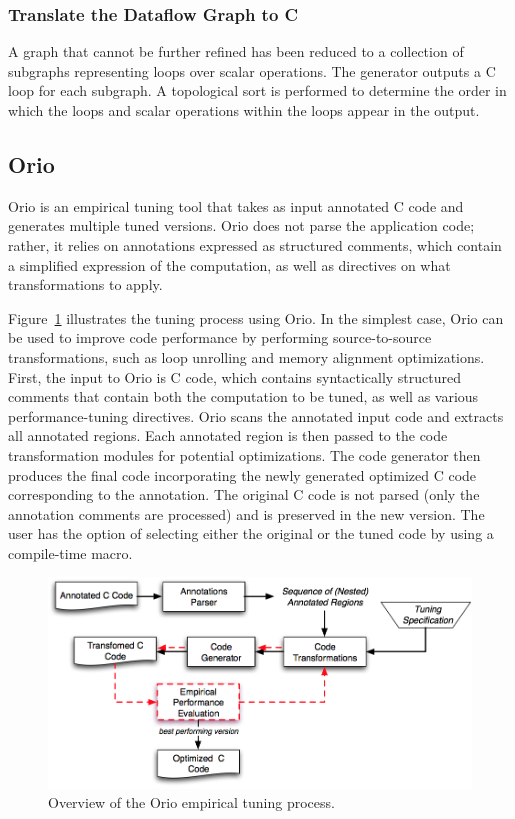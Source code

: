 \documentclass[runningheads]{llncs}
\begin{document}
\subsubsection{Translate the Dataflow Graph to C}

A graph that cannot be further refined has been reduced to a collection of subgraphs representing loops over scalar operations. The generator outputs a C loop for each subgraph.  A topological sort is performed to determine the order in which the loops and scalar operations within the loops appear in the output.
\subsection{Orio}
\label{sec:orio}

Orio is an empirical tuning tool that takes as input annotated C code and generates multiple tuned versions. Orio does not parse the application code; rather, it relies on annotations expressed as structured comments, which contain a simplified expression of the computation, as well as directives on what transformations to apply.

Figure~\ref{fig:orio} illustrates the tuning process using Orio. In the simplest case, Orio can be used to improve code performance by performing source-to-source transformations, such as loop unrolling and memory alignment optimizations. First, the input to Orio is C code, which contains syntactically structured comments that contain both the computation to be tuned, as well as various performance-tuning directives. Orio scans the annotated input code and extracts all annotated regions. Each annotated region is then passed to the code transformation modules for potential optimizations. The code generator then produces the final code incorporating the newly generated optimized C code corresponding to the annotation. The original C code is not parsed (only the annotation comments are processed) and is preserved in the new version. The user has the option of selecting either the original or the tuned code by using a compile-time macro.



\begin{figure}[htbp]
\centering
\includegraphics[width=.7\textwidth]{figures/orio.png}
\caption{Overview of the Orio empirical tuning process.}
\label{fig:orio}
\end{figure}
\end{document}

